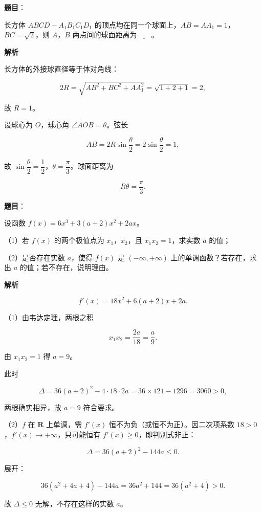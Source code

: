 \begin{answer}

\textbf{题目}：

长方体 $ABCD-A_1B_1C_1D_1$ 的顶点均在同一个球面上，$AB=AA_1=1$，$BC=\sqrt2$，则 $A$，$B$ 两点间的球面距离为$\underline{\qquad}$。
\nopagebreak[4]
\begin{center}\end{center}
\nopagebreak[4]
\textbf{解析}

长方体的外接球直径等于体对角线：

\nopagebreak[4]
\[2R=\sqrt{AB^2+BC^2+AA_1^2}=\sqrt{1+2+1}=2,\]

故 $R=1$。

设球心为 $O$，球心角 $\angle AOB=\theta$。弦长

\nopagebreak[4]
\[AB=2R\sin\frac\theta2=2\sin\frac\theta2=1,\]

故 $\sin\dfrac\theta2=\dfrac12$，$\theta=\dfrac\pi3$。球面距离为

\nopagebreak[4]
\[R\theta=\frac\pi3.\]


\end{answer}
\begin{answer}

\textbf{题目}：

设函数 $f(x)=6x^3+3(a+2)x^2+2ax$。

（1）若 $f(x)$ 的两个极值点为 $x_1$，$x_2$，且 $x_1x_2=1$，求实数 $a$ 的值；

（2）是否存在实数 $a$，使得 $f(x)$ 是 $(-\infty,+\infty)$ 上的单调函数？若存在，求出 $a$ 的值；若不存在，说明理由。

\textbf{解析}

\nopagebreak[4]
\[f'(x)=18x^2+6(a+2)x+2a.\]

（1）由韦达定理，两根之积

\nopagebreak[4]
\[x_1x_2=\frac{2a}{18}=\frac a9.\]

由 $x_1x_2=1$ 得 $a=9$。

此时

\nopagebreak[4]
\[\Delta=36(a+2)^2-4\cdot18\cdot2a=36\times121-1296=3060>0,\]

两根确实相异，故 $a=9$ 符合要求。

（2）$f$ 在 $\mathbf R$ 上单调，需 $f'(x)$ 恒不为负（或恒不为正）。因二次项系数 $18>0$，$f'(x)\to+\infty$，只可能恒有 $f'(x)\geqslant0$，即判别式非正：

\nopagebreak[4]
\[\Delta=36(a+2)^2-144a\leqslant0.\]

展开：

\nopagebreak[4]
\[36(a^2+4a+4)-144a=36a^2+144=36(a^2+4)>0.\]

故 $\Delta\leqslant0$ 无解，不存在这样的实数 $a$。


\end{answer}
